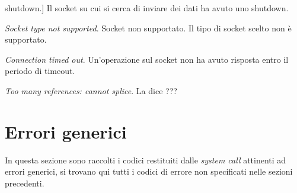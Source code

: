 \begin{basedescript}{\desclabelwidth{1.5cm}\desclabelstyle{\nextlinelabel}}
{    shutdown}.] Il socket su cui si cerca di inviare dei dati ha avuto uno
  shutdown.
\item[\errcode{ESOCKTNOSUPPORT} \textit{Socket type not supported}.] Socket
  non supportato. Il tipo di socket scelto non è supportato.
\item[\errcode{ETIMEDOUT} \textit{Connection timed out}.] Un'operazione sul
  socket non ha avuto risposta entro il periodo di timeout.
\item[\errcode{ETOOMANYREFS} \textit{Too many references: cannot splice}.] La
   dice ???
\end{basedescript}


\section{Errori generici}

In questa sezione sono raccolti i codici restituiti dalle \textit{system call}
attinenti ad errori generici, si trovano qui tutti i codici di errore non
specificati nelle sezioni precedenti.

